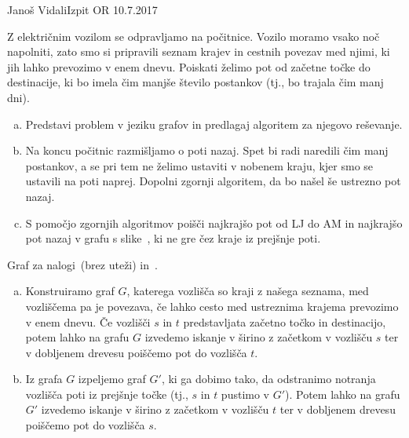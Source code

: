 \begin{naloga}{Janoš Vidali}{Izpit OR 10.7.2017}
\begin{vprasanje}
Z električnim vozilom se odpravljamo na počitnice.
Vozilo moramo vsako noč napolniti,
zato smo si pripravili seznam krajev in cestnih povezav med njimi,
ki jih lahko prevozimo v enem dnevu.
Poiskati želimo pot od začetne točke do destinacije,
ki bo imela čim manjše število postankov (tj., bo trajala čim manj dni).

\begin{enumerate}[(a)]
\item Predstavi problem v jeziku grafov
in predlagaj algoritem za njegovo reševanje.

\item Na koncu počitnic razmišljamo o poti nazaj.
Spet bi radi naredili čim manj postankov,
a se pri tem ne želimo ustaviti v nobenem kraju,
kjer smo se ustavili na poti naprej.
Dopolni zgornji algoritem, da bo našel še ustrezno pot nazaj.

\item S pomočjo zgornjih algoritmov poišči najkrajšo pot od LJ do AM
in najkrajšo pot nazaj v grafu s slike~\fig,
ki ne gre čez kraje iz prejšnje poti.
\end{enumerate}

\begin{slika}
\pgfslika
\caption{Graf za nalogi~\nal (brez uteži) in~\nal[pot].}
\end{slika}
\end{vprasanje}

\begin{odgovor}
\begin{enumerate}[(a)]
\item Konstruiramo graf $G$, katerega vozlišča so kraji z našega seznama,
med vozliščema pa je povezava,
če lahko cesto med ustreznima krajema prevozimo v enem dnevu.
Če vozlišči $s$ in $t$ predstavljata začetno točko in destinacijo,
potem lahko na grafu $G$ izvedemo iskanje v širino z začetkom v vozlišču $s$
ter v dobljenem drevesu poiščemo pot do vozlišča $t$.

\item Iz grafa $G$ izpeljemo graf $G'$, ki ga dobimo tako,
da odstranimo notranja vozlišča poti iz prejšnje točke
(tj., $s$ in $t$ pustimo v $G'$).
Potem lahko na grafu $G'$ izvedemo iskanje v širino z začetkom v vozlišču $t$
ter v dobljenem drevesu poiščemo pot do vozlišča $s$.


\end{enumerate}
\end{odgovor}
\end{naloga}
